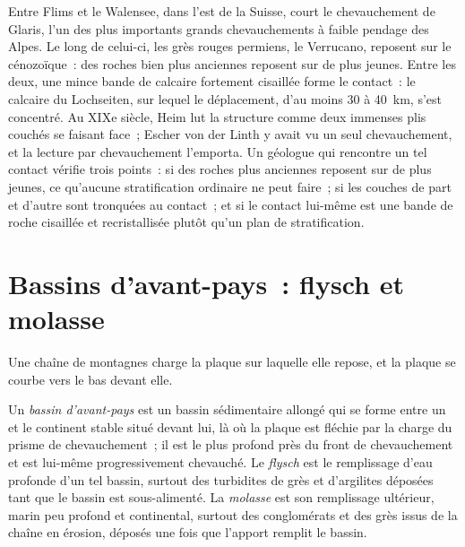 \begin{inthefield}
Entre Flims et le Walensee, dans l'est de la Suisse, court le chevauchement de Glaris, l'un des
plus importants grands chevauchements à faible pendage des Alpes. Le long de celui-ci, les grès rouges permiens,
le Verrucano, reposent sur le  cénozoïque~: des roches bien plus anciennes reposent sur de plus jeunes. Entre les deux, une
mince bande de calcaire fortement cisaillée forme le contact~: le calcaire du Lochseiten, sur lequel le déplacement, d'au moins 30 à
\qty{40}{km}, s'est concentré. Au XIXe siècle, Heim lut la structure comme deux immenses plis couchés
se faisant face~; Escher von der Linth y avait vu un seul chevauchement, et la lecture par chevauchement l'emporta. Un géologue qui rencontre un tel contact vérifie
trois points~: si des roches plus anciennes reposent sur de plus jeunes, ce qu'aucune stratification ordinaire ne peut faire~;
si les couches de part et d'autre sont tronquées au contact~; et si le contact
lui-même est une bande de roche cisaillée et recristallisée plutôt qu'un plan de stratification.
\end{inthefield}

\section{Bassins d'avant-pays~: flysch et molasse}\label{sec:b2:alpine-orogen:foreland}

Une chaîne de montagnes charge la plaque sur laquelle elle repose, et la plaque se courbe vers le bas devant elle.

\begin{definition}\label{def:b2:alpine-orogen:foreland}
Un \emph{bassin d'avant-pays} est un bassin sédimentaire allongé qui se forme
entre un  et le continent stable situé devant lui, là où la plaque est fléchie par la
charge du prisme de chevauchement~; il est le plus profond près du front de chevauchement et est lui-même
progressivement chevauché. Le \emph{flysch} est le remplissage d'eau profonde d'un tel
bassin, surtout des turbidites de grès et d'argilites déposées tant que le bassin est sous-alimenté.
La \emph{molasse} est son remplissage ultérieur, marin peu profond et continental, surtout
des conglomérats et des grès issus de la chaîne en érosion, déposés une fois que l'apport remplit le
bassin.
\end{definition}

